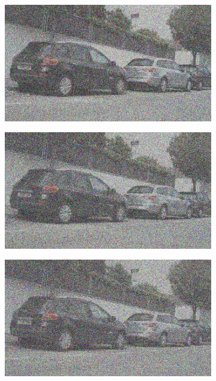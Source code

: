 \documentclass[a4paper]{ctexart}
\begin{document}
\begin{figure}[htbp]
\begin{subfigure}{0.08\textwidth}
			\label{fig：Gamma=0.8, Gauss Noise = 0.7}
		\end{subfigure}
		\begin{subfigure}{0.08\textwidth}
			\captionsetup{font=scriptsize}
			\includegraphics[width=\linewidth]{picture/Edge Detection/degrade/RGB_001 Gamma=0.8, Gauss Noise=0.8}
			\label{fig：Gamma=0.8, Gauss Noise = 0.8}
		\end{subfigure}
		\begin{subfigure}{0.08\textwidth}
			\captionsetup{font=scriptsize}
			\includegraphics[width=\linewidth]{picture/Edge Detection/degrade/RGB_001 Gamma=0.8, Gauss Noise=0.9}
			\label{fig：Gamma=0.8, Gauss Noise = 0.9}
		\end{subfigure}
		\begin{subfigure}{0.08\textwidth}
			\captionsetup{font=scriptsize}
			\includegraphics[width=\linewidth]{picture/Edge Detection/degrade/RGB_001 Gamma=0.8, Gauss Noise=1.0}

\end{subfigure}
\end{figure}
\end{document}

